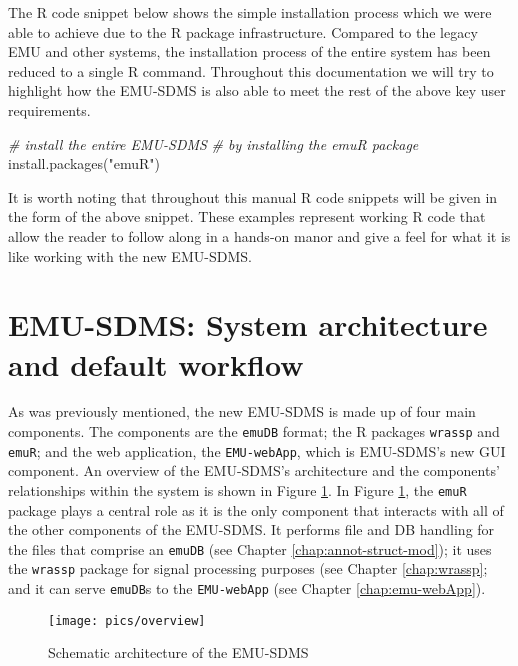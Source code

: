 \documentclass[
]{book}
\newenvironment{Shaded}{\begin{snugshade}}{\end{snugshade}}
\newcommand{\CommentTok}[1]{\textcolor[rgb]{0.56,0.35,0.01}{\textit{#1}}}
\newcommand{\FunctionTok}[1]{\textcolor[rgb]{0.00,0.00,0.00}{#1}}
\newcommand{\NormalTok}[1]{#1}
\newcommand{\StringTok}[1]{\textcolor[rgb]{0.31,0.60,0.02}{#1}}
\begin{document}
The R code snippet below shows the simple installation process which we were able to achieve due to the R package infrastructure. Compared to the legacy EMU and other systems, the installation process of the entire system has been reduced to a single R command. Throughout this documentation we will try to highlight how the EMU-SDMS is also able to meet the rest of the above key user requirements.

\begin{Shaded}
\begin{Highlighting}[]
\CommentTok{\# install the entire EMU{-}SDMS}
\CommentTok{\# by installing the emuR package}
\FunctionTok{install.packages}\NormalTok{(}\StringTok{"emuR"}\NormalTok{)}
\end{Highlighting}
\end{Shaded}

It is worth noting that throughout this manual R code snippets will be given in the form of the above snippet. These examples represent working R code that allow the reader to follow along in a hands-on manor and give a feel for what it is like working with the new EMU-SDMS.

\hypertarget{sec:overview-sysArch}{%
\section{EMU-SDMS: System architecture and default workflow}\label{sec:overview-sysArch}}

As was previously mentioned, the new EMU-SDMS is made up of four main components. The components are the \texttt{emuDB} format; the R packages \texttt{wrassp} and \texttt{emuR}; and the web application, the \texttt{EMU-webApp}, which is EMU-SDMS's new GUI component. An overview of the EMU-SDMS's architecture and the components' relationships within the system is shown in Figure \ref{fig:overview-archOver}. In Figure \ref{fig:overview-archOver}, the \texttt{emuR} package plays a central role as it is the only component that interacts with all of the other components of the EMU-SDMS. It performs file and DB handling for the files that comprise an \texttt{emuDB} (see Chapter \ref{chap:annot-struct-mod}); it uses the \texttt{wrassp} package for signal processing purposes (see Chapter \ref{chap:wrassp}; and it can serve \texttt{emuDB}s to the \texttt{EMU-webApp} (see Chapter \ref{chap:emu-webApp}).

\begin{figure}

{\centering \texttt{[image: pics/overview]} 

}

\caption{Schematic architecture of the EMU-SDMS}\label{fig:overview-archOver}
\end{figure}
\end{document}
